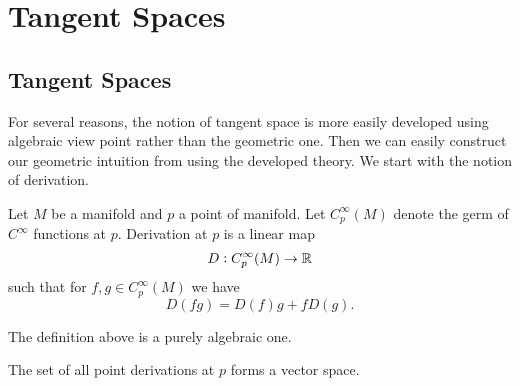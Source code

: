 \chapter{Tangent Spaces}

\section{Tangent Spaces}

For several reasons, the notion of tangent space is more easily developed using algebraic view point rather than the geometric one. Then we can easily construct our geometric intuition from using the developed theory. We start with the notion of derivation.


\begin{definition}
	Let $ M $ be a manifold and $ p $ a point of manifold. Let $ C_p^\infty(M) $ denote the germ of $ C^\infty $ functions at $ p $. Derivation at $ p $ is a linear map 
	\[ D: C_p^\infty(M) \to \mathbb{R} \]
	such that for $ f,g \in C_p^\infty(M) $ we have
	\[ D(fg) = D(f)g + fD(g). \]
\end{definition}
The definition above is a purely algebraic one.
\begin{remark}
	The set of all point derivations at $ p $ forms a vector space.
\end{remark}


